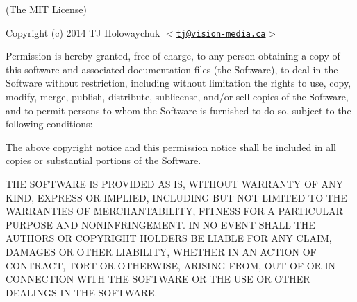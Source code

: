 (The M\+IT License)

Copyright (c) 2014 TJ Holowaychuk $<$\href{mailto:tj@vision-media.ca}{\tt tj@vision-\/media.\+ca}$>$

Permission is hereby granted, free of charge, to any person obtaining a copy of this software and associated documentation files (the \textquotesingle{}Software\textquotesingle{}), to deal in the Software without restriction, including without limitation the rights to use, copy, modify, merge, publish, distribute, sublicense, and/or sell copies of the Software, and to permit persons to whom the Software is furnished to do so, subject to the following conditions\+:

The above copyright notice and this permission notice shall be included in all copies or substantial portions of the Software.

T\+HE S\+O\+F\+T\+W\+A\+RE IS P\+R\+O\+V\+I\+D\+ED \textquotesingle{}AS IS\textquotesingle{}, W\+I\+T\+H\+O\+UT W\+A\+R\+R\+A\+N\+TY OF A\+NY K\+I\+ND, E\+X\+P\+R\+E\+SS OR I\+M\+P\+L\+I\+ED, I\+N\+C\+L\+U\+D\+I\+NG B\+UT N\+OT L\+I\+M\+I\+T\+ED TO T\+HE W\+A\+R\+R\+A\+N\+T\+I\+ES OF M\+E\+R\+C\+H\+A\+N\+T\+A\+B\+I\+L\+I\+TY, F\+I\+T\+N\+E\+SS F\+OR A P\+A\+R\+T\+I\+C\+U\+L\+AR P\+U\+R\+P\+O\+SE A\+ND N\+O\+N\+I\+N\+F\+R\+I\+N\+G\+E\+M\+E\+NT. IN NO E\+V\+E\+NT S\+H\+A\+LL T\+HE A\+U\+T\+H\+O\+RS OR C\+O\+P\+Y\+R\+I\+G\+HT H\+O\+L\+D\+E\+RS BE L\+I\+A\+B\+LE F\+OR A\+NY C\+L\+A\+IM, D\+A\+M\+A\+G\+ES OR O\+T\+H\+ER L\+I\+A\+B\+I\+L\+I\+TY, W\+H\+E\+T\+H\+ER IN AN A\+C\+T\+I\+ON OF C\+O\+N\+T\+R\+A\+CT, T\+O\+RT OR O\+T\+H\+E\+R\+W\+I\+SE, A\+R\+I\+S\+I\+NG F\+R\+OM, O\+UT OF OR IN C\+O\+N\+N\+E\+C\+T\+I\+ON W\+I\+TH T\+HE S\+O\+F\+T\+W\+A\+RE OR T\+HE U\+SE OR O\+T\+H\+ER D\+E\+A\+L\+I\+N\+GS IN T\+HE S\+O\+F\+T\+W\+A\+RE. 